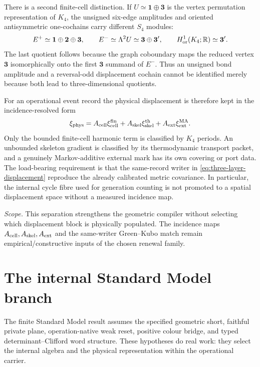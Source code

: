 \documentclass[11pt,a4paper,oneside]{book}
\theoremstyle{plain}
\theoremstyle{definition}
\theoremstyle{remark}
\newcommand{\R}{\mathbb R}
\newcommand{\src}[2]{\cite{#1}}
\newcommand{\scope}[1]{\par\smallskip\noindent\textit{Scope.} #1\par\smallskip}
\begin{document}
There is a second finite-cell distinction.  If
$U\simeq\mathbf1\oplus\mathbf3$ is the vertex permutation representation of
$K_4$, the unsigned six-edge amplitudes and oriented antisymmetric one-cochains
carry different $S_4$ modules:
\begin{equation}
 E^+\simeq\mathbf1\oplus\mathbf2\oplus\mathbf3,
 \qquad
 E^-\simeq\Lambda^2U\simeq\mathbf3\oplus\mathbf3',
 \qquad
 H^1_{\rm or}(K_4;\R)\simeq\mathbf3'.
 \label{eq:k4-edge-representation-fork}
\end{equation}
The last quotient follows because the graph coboundary maps the reduced vertex
$\mathbf3$ isomorphically onto the first $\mathbf3$ summand of $E^-$.  Thus an
unsigned bond amplitude and a reversal-odd displacement cochain cannot be
identified merely because both lead to three-dimensional quotients.
\src{PP40}{thm:v40-representation-fork}

For an operational event record the physical displacement is therefore kept in
the incidence-resolved form
\begin{equation}
 \xi_{\rm phys}
 =A_{\rm cell}\xi_{\rm cell}^{\rm fin}
 +A_{\rm skel}\xi_{\rm skel}^{\rm th}
 +A_{\rm ext}\xi_{\rm ext}^{\rm MA}.
 \label{eq:three-layer-displacement}
\end{equation}
Only the bounded finite-cell harmonic term is classified by $K_4$ periods.  An
unbounded skeleton gradient is classified by its thermodynamic transport
packet, and a genuinely Markov-additive external mark has its own covering or
port data.  The load-bearing requirement is that the same-record writer in
\eqref{eq:three-layer-displacement} reproduce the already calibrated metric
covariance.  In particular, the internal cycle fibre used for generation
counting is not promoted to a spatial displacement space without a measured
incidence map.  \src{PP40}{def:v40-two-scale-certificate}

\scope{This separation strengthens the geometric compiler without selecting
which displacement block is physically populated.  The incidence maps
$A_{\rm cell},A_{\rm skel},A_{\rm ext}$ and the same-writer Green--Kubo match
remain empirical/constructive inputs of the chosen renewal family.}

\section{The internal Standard Model branch}
The finite Standard Model result assumes the specified geometric short, faithful private plane, operation-native weak reset, positive colour bridge, and typed determinant--Clifford word structure. These hypotheses do real work: they select the internal algebra and the physical representation within the operational carrier.
\end{document}
